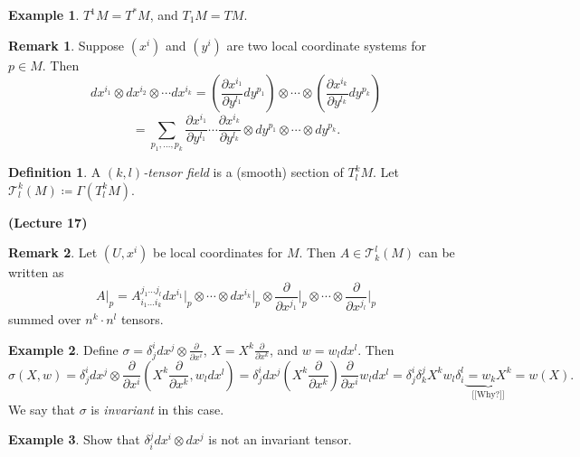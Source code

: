 \documentclass[10pt,letterpaper,cm]{nupset}
\theoremstyle{definition}
\newtheorem*{definition}{Definition}
\newtheorem{exmp}{Example}
\newtheorem{remark}{Remark}
\newcommand{\T}{\mathcal T}
\newcommand{\1}{\mathbf{1}}
\newcommand{\0}{\vec 0}
\begin{document}
\begin{exmp}
$T^1 M = T^{\ast}M$, and $T_1 M = TM$.
\end{exmp}

\begin{remark}
Suppose $(x^i)$ and $(y^i)$ are two local coordinate systems for $p\in M$. Then $$dx^{i_1} \otimes dx^{i_2} \otimes \cdots dx^{i_k} = (\frac{\partial{x^{i_1}}}{\partial{y^{l_1}}} dy^{p_1}) \otimes \cdots \otimes (\frac{\partial{x^{i_k}}}{\partial{y^{l_k}}} dy^{p_k})$$ $$ = \sum_{p_1, \ldots, p_k} \frac{\partial{x^{i_1}}}{\partial{y^{l_1}}}\cdots \frac{\partial{x^{i_k}}}{\partial{y^{l_k}}}  \otimes dy^{p_1} \otimes \cdots \otimes dy^{p_k}.$$
\end{remark}

\begin{definition}
A \textit{$(k, l)$-tensor field} is a (smooth) section of $T_l^kM$. Let $\T_l^k(M)\coloneqq  \Gamma(T_l^kM)$.
\end{definition}

\begin{center}
{\textbf{(Lecture 17)}} 
\end{center}

\begin{remark}
Let $(U, x^i)$ be local coordinates for $M$. Then $A \in \T_k^l(M)$ can be written as $$A\rvert_p = A_{i_1 \ldots i_k}^{j_1\ldots j_l} dx^{i_1}\rvert_p \otimes \cdots \otimes dx^{i_k}\rvert_p \otimes \frac{\partial}{\partial{x^{j_1}}}\rvert_p \otimes \cdots \otimes \frac{\partial}{\partial{x^{j_l}}}\rvert_p$$ summed over $n^k\cdot n^l$ tensors.
\end{remark}

\begin{exmp}
Define $\sigma = \delta_j^i dx^j \otimes \frac{\partial}{\partial{x^i}}$, $X = X^k \frac{\partial}{\partial{x^k}}$, and $w = w_ldx^l$. Then $$\sigma(X, w) = \delta_j^i dx^j \otimes \frac{\partial}{\partial{x^i}}(X^k \frac{\partial}{\partial{x^k}}, w_ldx^l) = \delta_j^i dx^j (X^k \frac{\partial}{\partial{x^k}}) \frac{\partial}{\partial{x^i}} w_ldx^l = \delta_j^i \delta_k^j X^k w_l\delta_i^l \underbrace{= w_kX^k}_{\text{[[Why?]]}} = w(X).$$ We say that $\sigma$ is \textit{invariant} in this case.
\end{exmp}

\begin{exmp}
Show that $\delta_i^j dx^i \otimes dx^j$ is not an invariant tensor. 
\end{exmp}
\end{document}
